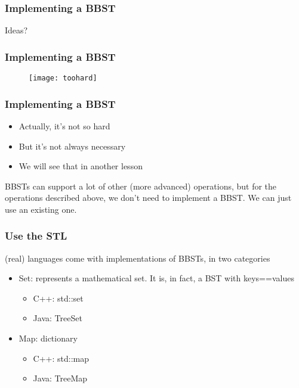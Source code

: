 \begin{frame}
	\frametitle{Implementing a BBST}
	Ideas?
\end{frame}

\begin{frame}
	\frametitle{Implementing a BBST}
	\begin{figure}
		\centering
		\texttt{[image: toohard]}
	\end{figure}
\end{frame}

\begin{frame}
	\frametitle{Implementing a BBST}
	\begin{itemize}   
		\item Actually, it's not so hard
                \item But it's not always necessary
		\item We will see that in another lesson
	\end{itemize}
	BBSTs can support a lot of other (more advanced) operations, but for the operations described above, we don't need to implement a BBST. We can just use an existing one.
\end{frame}

\begin{frame}
	\frametitle{Use the STL}
	(real) languages come with implementations of BBSTs, in two categories
	\begin{itemize}
		\item Set: represents a mathematical set. It is, in fact, a BST with keys==values
			\begin{itemize}
				\item C++: std::set
				\item Java: TreeSet
			\end{itemize}
		\item Map: dictionary
		\begin{itemize}
			\item C++: std::map
			\item Java: TreeMap
		\end{itemize}
	\end{itemize}
\end{frame}